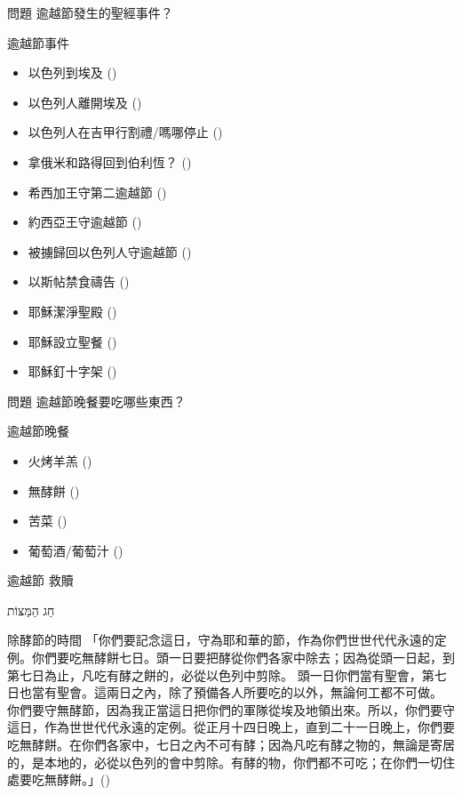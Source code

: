 \documentclass{beamer}
\newcommand{\topic}[1]{
  \begin{frame}
    \centering
    \vspace*{1cm}
    {\fontsize{40}{48}\selectfont #1\par}
    \vfill
  \end{frame}
}
\newcommand{\question}[1]{
  \begin{frame}{問題}
    \centering
    \vspace*{1cm}
    \huge #1？\par
    \vfill
  \end{frame}
}
\newcommand{\conclusion}[2]{
  \begin{frame}
    \centering
    \vspace*{1cm}
    {\fontsize{40}{48}\selectfont #1 \textemdash #2\par}
    \vfill
  \end{frame}
}
\newcommand{\parvspace}{\par\vspace{0.5em}}
\begin{document}
\question{逾越節發生的聖經事件}

\begin{frame}{逾越節事件}
  \begin{itemize}
    \item 以色列到埃及 ()
    \item 以色列人離開埃及 ()
    \item 以色列人在吉甲行割禮/嗎哪停止 ()
    \item 拿俄米和路得回到伯利恆？ ()
    \item 希西加王守第二逾越節 ()
    \item 約西亞王守逾越節 ()
    \item 被擄歸回以色列人守逾越節 ()
    \item 以斯帖禁食禱告 ()
    \item 耶穌潔淨聖殿 ()
    \item 耶穌設立聖餐 ()
    \item 耶穌釘十字架 ()
  \end{itemize}
\end{frame}

\question{逾越節晚餐要吃哪些東西}

\begin{frame}{逾越節晚餐}
  \begin{itemize}
    \item 火烤羊羔 ()
    \item 無酵餅 ()
    \item 苦菜 ()
    \item 葡萄酒/葡萄汁 ()
  \end{itemize}
\end{frame}

\conclusion{逾越節}{救贖}

\topic{\texthebrew{חַג הַמַּצּוֹת}}

\begin{frame}{除酵節的時間}
  「你們要記念這日，守為耶和華的節，作為你們世世代代永遠的定例。\alert{你們要吃無酵餅七日。頭一日要把酵從你們各家中除去}；因為從頭一日起，到第七日為止，凡吃有酵之餅的，必從以色列中剪除。
  \alert{頭一日你們當有聖會，第七日也當有聖會}。這兩日之內，除了預備各人所要吃的以外，無論何工都不可做。
  \alert{你們要守無酵節，因為我正當這日把你們的軍隊從埃及地領出來}。所以，你們要守這日，作為世世代代永遠的定例。從\alert{正月十四日晚上，直到二十一日晚上}，你們要吃無酵餅。在你們各家中，七日之內不可有酵；因為凡吃有酵之物的，無論是寄居的，是本地的，必從以色列的會中剪除。有酵的物，你們都不可吃；在你們一切住處要吃無酵餅。」()\parvspace
\end{frame}
\end{document}
